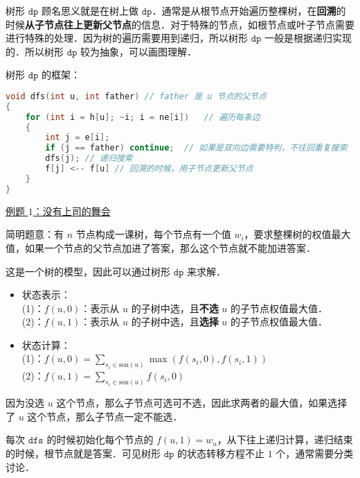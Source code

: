 
树形 $\texttt{dp}$ 顾名思义就是在树上做 $\texttt{dp}$．通常是从根节点开始遍历整棵树，在\textbf{回溯}的时候\textbf{从子节点往上更新父节点}的信息．对于特殊的节点，如根节点或叶子节点需要进行特殊的处理．因为树的遍历需要用到递归，所以树形 $\texttt{dp}$ 一般是根据递归实现的．所以树形 $\texttt{dp}$ 较为抽象，可以画图理解．

树形 $\texttt{dp}$ 的框架：

\begin{lstlisting}[language=cpp]
void dfs(int u, int father) // father 是 u 节点的父节点
{
    for (int i = h[u]; ~i; i = ne[i])   // 遍历每条边
    {
        int j = e[i];
        if (j == father) continue;  // 如果是双向边需要特判，不往回重复搜索
        dfs(j); // 递归搜索
        f[j] <-- f[u] // 回溯的时候，用子节点更新父节点
    }
}
\end{lstlisting}

\href{https://www.luogu.com.cn/problem/P1352}{例题 $1$：没有上司的舞会}

简明题意：有 $n$ 节点构成一课树，每个节点有一个值 $w_i$，要求整棵树的权值最大值，如果一个节点的父节点加进了答案，那么这个节点就不能加进答案．

这是一个树的模型，因此可以通过树形 $\texttt{dp}$ 来求解．

\begin{itemize}
\item 状态表示：\\
    (1)：$f(u, 0)$：表示从 $u$ 的子树中选，且\textbf{不选} $u$ 的子节点权值最大值．\\
    (2)：$f(u, 1)$：表示从 $u$ 的子树中选，且\textbf{选择} $u$ 的子节点权值最大值．

\end{itemize}

\begin{itemize}
\item 状态计算：\\
    (1)：$f(u, 0) = \sum_{s_i \in \text{son}(u)} \max(f(s_i, 0), f(s_i, 1))$ \\
    (2)：$f(u, 1) = \sum_{s_i \in \text{son}(u)} f(s_i, 0)$
\end{itemize}

因为没选 $u$ 这个节点，那么子节点可选可不选，因此求两者的最大值，如果选择了 $u$ 这个节点，那么子节点一定不能选．

每次 $\texttt{dfs}$ 的时候初始化每个节点的 $f(u, 1) = w_u$，从下往上递归计算，递归结束的时候，根节点就是答案．可见树形 $\texttt{dp}$ 的状态转移方程不止 $1$ 个，通常需要分类讨论．


